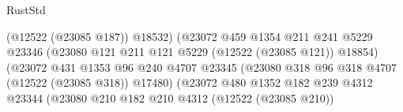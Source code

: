 \begin{lexlean}{RustStd}
\begin{coremodule}
                                                    (@12522 (@23085 @187))
                                                    @18532)
                                                  (@23072
                                                    @459
                                                    @1354
                                                    @211
                                                    @241
                                                    @5229
                                                    @23346
                                                    (@23080
                                                      @121
                                                      @211
                                                      @121
                                                      @5229
                                                      (@12522 (@23085 @121))
                                                      @18854)
                                                    (@23072
                                                      @431
                                                      @1353
                                                      @96
                                                      @240
                                                      @4707
                                                      @23345
                                                      (@23080
                                                        @318
                                                        @96
                                                        @318
                                                        @4707
                                                        (@12522 (@23085 @318))
                                                        @17480)
                                                      (@23072
                                                        @480
                                                        @1352
                                                        @182
                                                        @239
                                                        @4312
                                                        @23344
                                                        (@23080
                                                          @210
                                                          @182
                                                          @210
                                                          @4312
                                                          (@12522 (@23085 @210))

\end{coremodule}
\end{lexlean}
